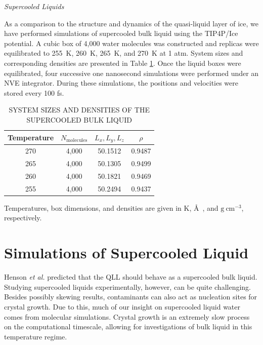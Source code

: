 \vspace{0.6cm}
\begin{flushleft}
\textit{Supercooled Liquids}
\end{flushleft}
As a comparison to the structure and dynamics of the quasi-liquid
layer of ice, we have performed simulations of supercooled bulk liquid using the
TIP4P/Ice potential. A cubic box of 4,000 water molecules was
constructed and replicas were equilibrated to 255~K, 260~K, 265~K, and
270~K at 1 atm. System sizes and corresponding densities are presented in Table
\ref{tab:qll-liquid}. Once the liquid boxes were equilibrated, four
successive one nanosecond simulations were performed under an NVE
integrator. During these simulations, the positions and velocities
were stored every 100 fs.

\begin{table}[h] \centering \caption{SYSTEM SIZES AND DENSITIES OF THE
    SUPERCOOLED BULK LIQUID\label{tab:qll-liquid}}
\begin{threeparttable}
\begin{tabular}{cccc}
\hline
\hline
 Temperature & $N_\mathrm{molecules}$ & $L_x, L_y, L_z$ & $\rho$\\
\hline
270 & 4,000 & 50.1512 & 0.9487 \\
265 & 4,000 & 50.1305 & 0.9499 \\
260 & 4,000 & 50.1821 & 0.9469 \\
255 & 4,000 & 50.2494 & 0.9437 \\
\hline
\hline
\end{tabular}
\begin{tablenotes}
      \small
    \item Temperatures, box dimensions, and densities are given in K,
      \AA~, and $\mathrm{g}~\mathrm{cm}^{-3}$, respectively.
\end{tablenotes}
\end{threeparttable}
\end{table}



\section{Simulations of Supercooled Liquid}
Henson \textit{et al.} predicted that the QLL should behave as a
supercooled bulk liquid.\cite{Henson2005} Studying supercooled liquids
experimentally, however, can be quite challenging. Besides possibly
skewing results, contaminants can also act as nucleation sites for
crystal growth. Due to this, much of our insight on supercooled liquid
water comes from molecular simulations. Crystal growth is an extremely
slow process on the computational timescale, allowing for
investigations of bulk liquid in this temperature regime. 

